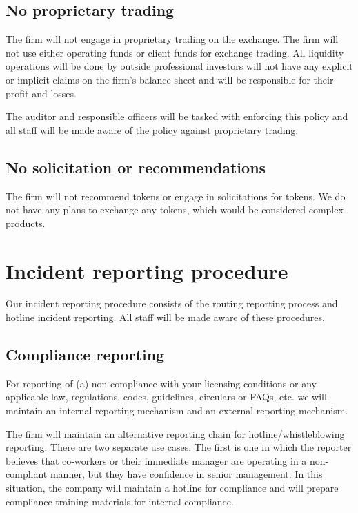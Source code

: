 \subsection{No proprietary trading}

The firm will not engage in proprietary trading on the exchange.  The firm will not use either operating funds or client funds for exchange
trading.  All liquidity operations will be done by outside
professional investors will not have any explicit or implicit claims
on the firm's balance sheet and will be responsible for their
profit and losses.

The auditor and responsible officers will be tasked with enforcing
this policy and all staff will be made aware of the policy against
proprietary trading.

\subsection{No solicitation or recommendations}
The firm will not recommend tokens or engage in solicitations for
tokens.  We do not have any plans to exchange any tokens, which would
be considered complex products.

\section{Incident reporting procedure}

Our incident reporting procedure consists of the routing reporting
process and hotline incident reporting.  All staff will be
made aware of these procedures.

\subsection{Compliance reporting}

For reporting of (a) non-compliance with your licensing conditions or
any applicable law, regulations, codes, guidelines, circulars or
FAQs, etc. we will maintain an internal reporting mechanism and an
external reporting mechanism.

The firm will maintain an alternative reporting chain for
hotline/whistleblowing reporting.  There are two separate use cases.
The first is one in which the reporter believes that co-workers or
their immediate manager are operating in a non-compliant manner, but
they have confidence in senior management.  In this situation, the
company will maintain a hotline for compliance and will prepare
compliance training materials for internal compliance.

